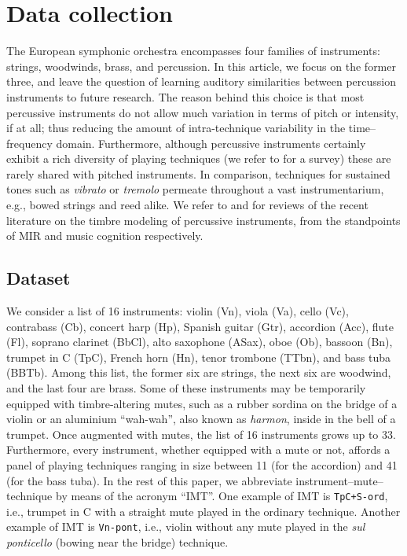 \documentclass{bmcart}
\makeatletter
\newcommand*{\eg}{e.g.,\@\xspace}
\newcommand*{\ie}{i.e.,\@\xspace}
\newcommand{\nmu}{}
\makeatother
\begin{document}

\section*{\nmu Data collection}
\label{sec:survey}

The European symphonic orchestra encompasses four families of instruments: strings, woodwinds, brass, and percussion.
In this article, we focus on the former three, and leave the question of learning auditory similarities between percussion instruments to future research.
The reason behind this choice is that most percussive instruments do not allow much variation in terms of pitch or intensity, if at all; thus reducing the amount of intra-technique variability in the time--frequency domain.
Furthermore, although percussive instruments certainly exhibit a rich diversity of playing techniques (we refer to \cite{peinkofer1976book} for a survey) these are rarely shared with pitched instruments.
In comparison, techniques for sustained tones such as \emph{vibrato} or \emph{tremolo} permeate throughout a vast instrumentarium, \eg{} bowed strings and reed alike.
We refer to \cite{wu2018taslp} and \cite{pearce2019appliedsciences} for reviews of the recent literature on the timbre modeling of percussive instruments, from the standpoints of MIR and music cognition respectively.

\subsection*{Dataset}
We consider a list of 16 instruments: violin (Vn), viola (Va), cello (Vc), contrabass (Cb), concert harp (Hp), Spanish guitar (Gtr), accordion (Acc), flute (Fl), soprano clarinet (BbCl), alto saxophone (ASax), oboe (Ob), bassoon (Bn), trumpet in C (TpC), French horn (Hn), tenor trombone (TTbn), and bass tuba (BBTb).
Among this list, the former six are strings, the next six are woodwind, and the last four are brass.
Some of these instruments may be temporarily equipped with timbre-altering mutes, such as a rubber sordina on the bridge of a violin or an aluminium ``wah-wah'', also known as \emph{harmon}, inside in the bell of a trumpet.
Once augmented with mutes, the list of 16 instruments grows up to 33.
Furthermore, every instrument, whether equipped with a mute or not, affords a panel of playing techniques ranging in size between 11 (for the accordion) and 41 (for the bass tuba).
In the rest of this paper, we abbreviate instrument--mute--technique by means of the acronym ``IMT''.
One example of IMT is \texttt{TpC+S-ord}, \ie{} trumpet in C with a straight mute played in the ordinary technique.
Another example of IMT is \texttt{Vn-pont}, \ie{} violin without any mute played in the \emph{sul ponticello} (bowing near the bridge) technique.
\end{document}

